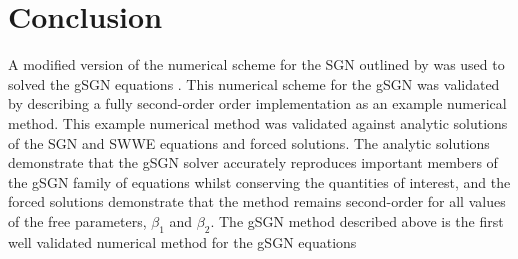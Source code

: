 \documentclass[10pt]{elsarticle}
\begin{document}
\section{Conclusion}
A modified version of the numerical scheme for the SGN outlined by \citet{Zoppou-etal-2017} was used to solved the gSGN equations \cite{Clamond-et.al-2017-245,Clamond-Dutykh-2018-237}. This numerical scheme for the gSGN was validated by describing a fully second-order order implementation as an example numerical method. This example numerical method was validated against analytic solutions of the SGN and SWWE equations and forced solutions. The analytic solutions demonstrate that the gSGN solver accurately reproduces important members of the gSGN family of equations whilst conserving the quantities of interest, and the forced solutions demonstrate that the method remains second-order for all values of the free parameters, $\beta_1$ and $\beta_2$. The gSGN method described above is the first well validated numerical method for the gSGN equations
 



\end{document}
